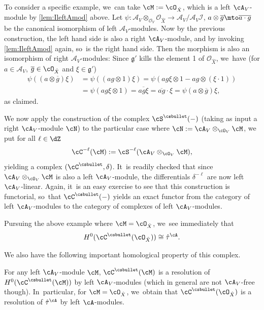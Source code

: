 To consider a specific example, we~can take $\cM:=\cO_{\hat{X}}$, which is a left $\cA_V$\nobreakdash-mod\-ule by \cref{lem:IleftAmod} above.
Let $\psi\colon \mathscr{A}_V\otimes_{\mathcal{O}_V}\mathcal{O}_{\hat{X}}\to \mathscr{A}_V/\mathscr{A}_V\mathcal{I}$, $a\otimes \overline{g}\mto \overline{a\cdot g}$ be the canonical isomorphism of left $\mathscr{A}_V$\nobreakdash-mod\-ules. Now by the previous construction, the left hand side is also a right $\cA_V$\nobreakdash-mod\-ule, and by invoking \cref{lem:IleftAmod} again, so~is the right hand side. Then the morphism is also an isomorphism of right $\mathscr{A}_V$\nobreakdash-mod\-ules: Since $\mathfrak{g}'$ kills the element 1 of $\mathcal{O}_{\hat{X}}$, we~have (for $a\in \mathscr{A}_V$, $\overline{g}\in\cO_{\hat{X}}$ and $\xi\in \mathfrak{g}'$)
\begin{align*}
\psi((a\otimes \overline{g})\xi) &= \psi((ag\otimes 1)\xi)
= \psi(ag\xi\otimes 1 - ag\otimes (\xi\cdot 1))\\
&= \psi(ag\xi\otimes 1)= \overline{ag\xi}= \overline{ag}\cdot \xi= \psi(a\otimes \overline{g})\xi,
\end{align*}
as claimed.

We now apply the construction of the complex $\cS^{\csbullet}(-)$ (taking as input a right $\cA_V$\nobreakdash-mod\-ule $\cN$) to the particular case where $\cN:=\cA_V\otimes_{\cO_V}\cM$, \ie we put for all $\ell\in\dZ$
\[
\cC^{-\ell}(\cM):=\cS^{-\ell}(\cA_V\otimes_{\cO_V}\cM),
\]
yielding a complex $(\cC^{\csbullet}, \delta)$. It~is readily checked that since $\cA_V\otimes_{\cO_V}\cM$ is also a left $\cA_V$\nobreakdash-mod\-ule, the differentials $\delta^{-\ell}$ are now left $\cA_V$-linear. Again, it~is an easy exercise to see that this construction is functorial, so~that $\cC^{\csbullet}(-)$ yields an exact functor from the category of left $\cA_V$\nobreakdash-mod\-ules to the category of complexes of left $\cA_V$\nobreakdash-mod\-ules.

Pursuing the above example where $\cM=\cO_{\hat{X}}$, we~see immediately that
\[
H^0(\cC^{\csbullet}(\cO_{\hat{X}})) \cong \hat\tau^\cA.
\]

We also have the following important homological property of this complex.

\begin{lem}
For any left $\cA_V$\nobreakdash-mod\-ule $\cM$,
$\cC^{\csbullet}(\cM)$ is a resolution of $H^0(\cC^{\csbullet}(\cM))$ by left $\cA_V$\nobreakdash-mod\-ules
(which in general are not $\cA_V$-free though). In~particular, for $\cM=\cO_{\hat{X}}$, we~obtain
that $\cC^{\csbullet}(\cO_{\hat{X}})$ is a resolution of $\hat{\tau}^\cA$ by left $\cA$\nobreakdash-mod\-ules.
\end{lem}

